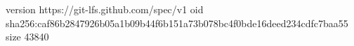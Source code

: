 version https://git-lfs.github.com/spec/v1
oid sha256:caf86b2847926b05a1b09b44f6b151a73b078bc4f0bde16deed234cdfc7baa55
size 43840
